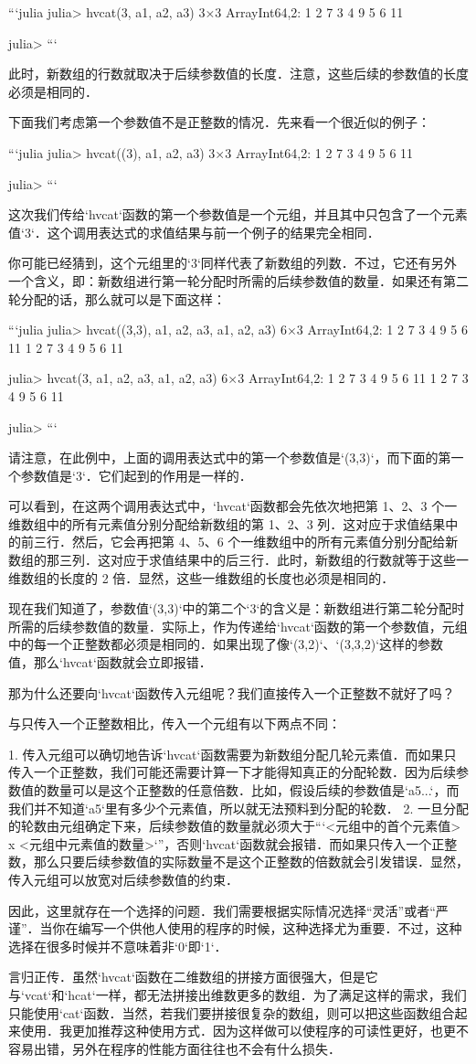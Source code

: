 ```julia
julia> hvcat(3, a1, a2, a3)
3×3 Array{Int64,2}:
 1  2   7
 3  4   9
 5  6  11

julia> 
```

此时，新数组的行数就取决于后续参数值的长度．注意，这些后续的参数值的长度必须是相同的．

下面我们考虑第一个参数值不是正整数的情况．先来看一个很近似的例子：

```julia
julia> hvcat((3),  a1, a2, a3)
3×3 Array{Int64,2}:
 1  2   7
 3  4   9
 5  6  11

julia>
```

这次我们传给`hvcat`函数的第一个参数值是一个元组，并且其中只包含了一个元素值`3`．这个调用表达式的求值结果与前一个例子的结果完全相同．

你可能已经猜到，这个元组里的`3`同样代表了新数组的列数．不过，它还有另外一个含义，即：新数组进行第一轮分配时所需的后续参数值的数量．如果还有第二轮分配的话，那么就可以是下面这样：

```julia
julia> hvcat((3,3), a1, a2, a3, a1, a2, a3)
6×3 Array{Int64,2}:
 1  2   7
 3  4   9
 5  6  11
 1  2   7
 3  4   9
 5  6  11

julia> hvcat(3, a1, a2, a3, a1, a2, a3)
6×3 Array{Int64,2}:
 1  2   7
 3  4   9
 5  6  11
 1  2   7
 3  4   9
 5  6  11

julia> 
```

请注意，在此例中，上面的调用表达式中的第一个参数值是`(3,3)`，而下面的第一个参数值是`3`．它们起到的作用是一样的．

可以看到，在这两个调用表达式中，`hvcat`函数都会先依次地把第 1、2、3 个一维数组中的所有元素值分别分配给新数组的第 1、2、3 列．这对应于求值结果中的前三行．然后，它会再把第 4、5、6 个一维数组中的所有元素值分别分配给新数组的那三列．这对应于求值结果中的后三行．此时，新数组的行数就等于这些一维数组的长度的 2 倍．显然，这些一维数组的长度也必须是相同的．

现在我们知道了，参数值`(3,3)`中的第二个`3`的含义是：新数组进行第二轮分配时所需的后续参数值的数量．实际上，作为传递给`hvcat`函数的第一个参数值，元组中的每一个正整数都必须是相同的．如果出现了像`(3,2)`、`(3,3,2)`这样的参数值，那么`hvcat`函数就会立即报错．

那为什么还要向`hvcat`函数传入元组呢？我们直接传入一个正整数不就好了吗？

与只传入一个正整数相比，传入一个元组有以下两点不同：

1. 传入元组可以确切地告诉`hvcat`函数需要为新数组分配几轮元素值．而如果只传入一个正整数，我们可能还需要计算一下才能得知真正的分配轮数．因为后续参数值的数量可以是这个正整数的任意倍数．比如，假设后续的参数值是`a5...`，而我们并不知道`a5`里有多少个元素值，所以就无法预料到分配的轮数．
2. 一旦分配的轮数由元组确定下来，后续参数值的数量就必须大于“`<元组中的首个元素值> x <元组中元素值的数量>`”，否则`hvcat`函数就会报错．而如果只传入一个正整数，那么只要后续参数值的实际数量不是这个正整数的倍数就会引发错误．显然，传入元组可以放宽对后续参数值的约束．

因此，这里就存在一个选择的问题．我们需要根据实际情况选择“灵活”或者“严谨”．当你在编写一个供他人使用的程序的时候，这种选择尤为重要．不过，这种选择在很多时候并不意味着非`0`即`1`．

言归正传．虽然`hvcat`函数在二维数组的拼接方面很强大，但是它与`vcat`和`hcat`一样，都无法拼接出维数更多的数组．为了满足这样的需求，我们只能使用`cat`函数．当然，若我们要拼接很复杂的数组，则可以把这些函数组合起来使用．我更加推荐这种使用方式．因为这样做可以使程序的可读性更好，也更不容易出错，另外在程序的性能方面往往也不会有什么损失．